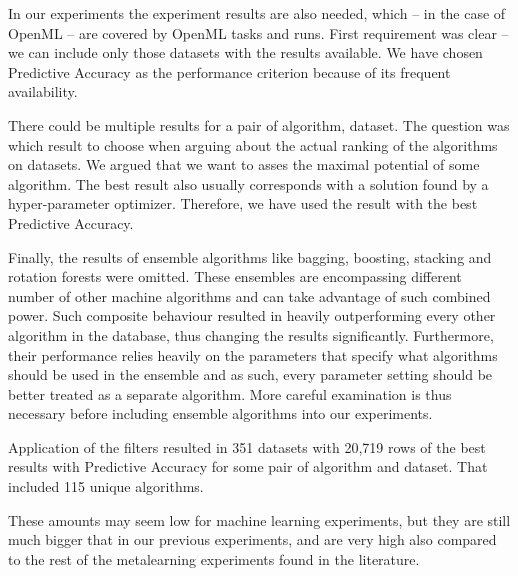 \documentclass{article}
\begin{document}
\begin{refsegment}
In our experiments the experiment results are also needed, which -- in the case of OpenML -- are covered by OpenML tasks and runs. First requirement was clear -- we can include only those datasets with the results available. We have chosen  Predictive Accuracy as the performance criterion because of its frequent availability.

There could be multiple results for a pair of algorithm, dataset. The question was which result to choose when arguing about the actual ranking of the algorithms on datasets. We argued that we want to asses the maximal potential of some algorithm. The best result also usually corresponds with a solution found by a hyper-parameter optimizer. Therefore, we have used the result with the best Predictive Accuracy.

Finally, the results of ensemble algorithms like bagging, boosting, stacking and rotation forests \cite{rotationForests} were omitted. These ensembles are encompassing different number of other machine algorithms and can take advantage of such combined power. Such composite behaviour resulted in heavily outperforming every other algorithm in the database, thus changing the results significantly. Furthermore, their performance relies heavily on the parameters that specify what algorithms should be used in the ensemble and as such, every parameter setting should be better treated as a separate algorithm. More careful examination is thus necessary before including ensemble algorithms into our experiments.

Application of the filters resulted in 351 datasets with 20,719 rows of the best results with Predictive Accuracy for some pair of algorithm and dataset. That included 115 unique algorithms.

These amounts may seem low for machine learning experiments, but they are still much bigger that in our previous experiments, and are very high also compared to the rest of the metalearning experiments found in the literature.



\end{refsegment}
\end{document}
